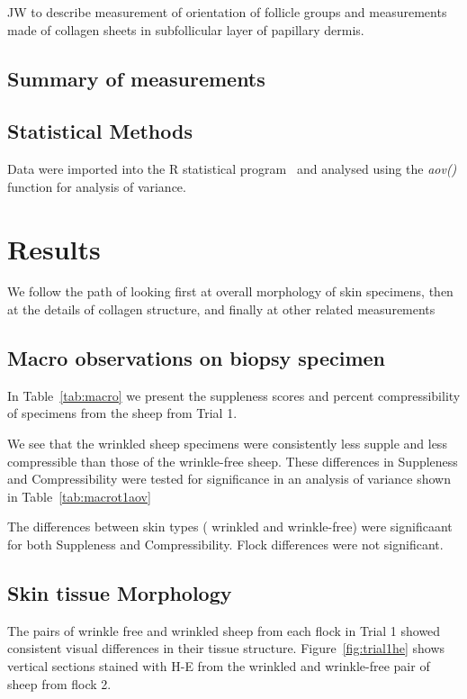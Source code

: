 \documentclass[titlepage]{article}  %
\begin{document}
JW to describe measurement of orientation of follicle groups
and measurements made of collagen sheets in subfollicular layer of
papillary dermis.


\subsection{Summary of measurements}


\subsection{Statistical Methods}

Data were imported into the R statistical program~\cite{rprog:13} and analysed using the {\em aov()} function for analysis of variance.

\section{Results}
We follow the path of looking first at overall morphology of skin specimens, then at the details of collagen structure, and finally at other related measurements

\subsection{Macro observations on biopsy specimen}
In Table~\ref{tab:macro} we present the suppleness scores and percent compressibility of specimens from the sheep from Trial 1.

We see that the wrinkled sheep specimens were consistently less supple and less compressible than those of the wrinkle-free sheep.
These differences in Suppleness and Compressibility were tested for significance in an analysis of variance shown in Table~\ref{tab:macrot1aov}

The differences between skin types ( wrinkled and wrinkle-free) were significaant for both Suppleness and Compressibility. Flock differences were not significant.

\subsection{Skin tissue Morphology}
The pairs of wrinkle free and wrinkled sheep from each flock in Trial 1 showed consistent visual differences in their tissue structure. Figure~\ref{fig:trial1he} shows vertical sections stained with H-E from the wrinkled and wrinkle-free pair of sheep from flock 2.


\end{document}
